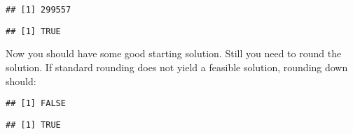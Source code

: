 \documentclass[
]{article}
\newenvironment{Shaded}{\begin{snugshade}}{\end{snugshade}}
\newcommand{\CommentTok}[1]{\textcolor[rgb]{0.56,0.35,0.01}{\textit{#1}}}
\newcommand{\DataTypeTok}[1]{\textcolor[rgb]{0.13,0.29,0.53}{#1}}
\newcommand{\KeywordTok}[1]{\textcolor[rgb]{0.13,0.29,0.53}{\textbf{#1}}}
\newcommand{\NormalTok}[1]{#1}
\newcommand{\OperatorTok}[1]{\textcolor[rgb]{0.81,0.36,0.00}{\textbf{#1}}}
\newcommand{\StringTok}[1]{\textcolor[rgb]{0.31,0.60,0.02}{#1}}
\begin{document}
\begin{Shaded}
\end{Shaded}

\begin{verbatim}
## [1] 299557
\end{verbatim}

\begin{Shaded}
\end{Shaded}

\begin{verbatim}
## [1] TRUE
\end{verbatim}

Now you should have some good starting solution. Still you need to round
the solution. If standard rounding does not yield a feasible solution,
rounding down should:

\begin{Shaded}
\end{Shaded}

\begin{verbatim}
## [1] FALSE
\end{verbatim}

\begin{Shaded}
\end{Shaded}

\begin{verbatim}
## [1] TRUE
\end{verbatim}
\end{document}
